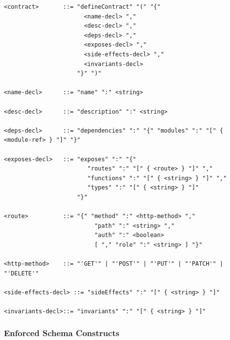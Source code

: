 \begin{verbatim}
<contract>       ::= "defineContract" "(" "{" 
                       <name-decl> ","
                       <desc-decl> ","
                       <deps-decl> ","
                       <exposes-decl> ","
                       <side-effects-decl> ","
                       <invariants-decl> 
                     "}" ")"

<name-decl>      ::= "name" ":" <string>

<desc-decl>      ::= "description" ":" <string>

<deps-decl>      ::= "dependencies" ":" "{" "modules" ":" "[" { <module-ref> } "]" "}"

<exposes-decl>   ::= "exposes" ":" "{"
                        "routes" ":" "[" { <route> } "]" ","
                        "functions" ":" "[" { <string> } "]" ","
                        "types" ":" "[" { <string> } "]"
                     "}"

<route>          ::= "{" "method" ":" <http-method> ","
                          "path" ":" <string> ","
                          "auth" ":" <boolean> 
                          [ "," "role" ":" <string> ] "}"

<http-method>    ::= "'GET'" | "'POST'" | "'PUT'" | "'PATCH'" | "'DELETE'"

<side-effects-decl> ::= "sideEffects" ":" "[" { <string> } "]"

<invariants-decl>::= "invariants" ":" "[" { <string> } "]"
\end{verbatim}

\subsubsection{Enforced Schema Constructs}

